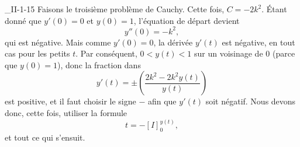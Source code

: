 \begin{corrige}{_II-1-15}
Faisons le troisième problème de Cauchy. Cette fois, $C=-2k^2$. Étant donné que $y'(0)=0$ et $y(0)=1$, l'équation de départ devient 
\begin{equation}
	y''(0)=-k^2,
\end{equation}
qui est négative. Mais comme $y'(0)=0$, la dérivée $y'(t)$ est négative, en tout cas pour les petits $t$. Par conséquent, $0<y(t)<1$ sur un voisinage de $0$ (parce que $y(0)=1$), donc la fraction dans
\begin{equation}
	y'(t)=\pm\left( \frac{ 2k^2-2k^2y(t) }{ y(t) } \right)
\end{equation}
est positive, et il faut choisir le signe $-$ afin que $y'(t)$ soit négatif. Nous devons donc, cette fois, utiliser la formule
\begin{equation}
	t=-[I]_0^{y(t)},
\end{equation}
 et tout ce qui s'ensuit.


\end{corrige}
